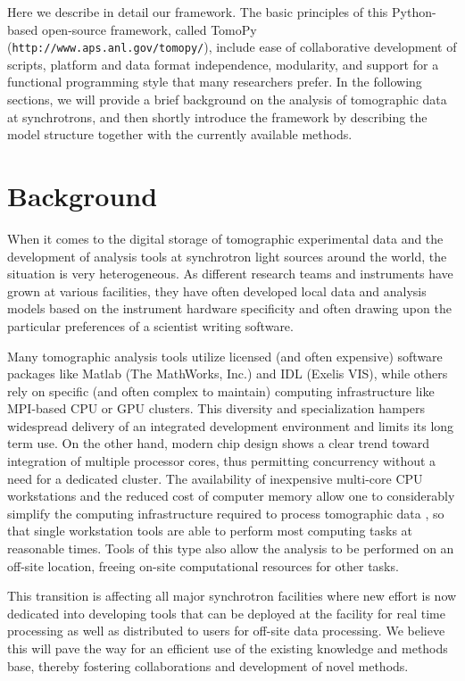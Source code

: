 \documentclass[pdf]{iucr}              %
\begin{document}
Here we describe in detail our framework. The basic principles of this Python-based open-source framework, called TomoPy (\texttt{http://www.aps.anl.gov/tomopy/}), include ease of collaborative development of scripts, platform and data format independence, modularity,  and support for a functional programming style that many researchers prefer. In the following sections, we will provide a brief background on the analysis of tomographic data at synchrotrons, and then shortly introduce the framework by describing the model structure together with the currently available methods. 


\section{Background}

When it comes to the digital storage of tomographic experimental data and the development of analysis tools at synchrotron light sources around the world, the situation is very heterogeneous. As different research teams and instruments have grown at various facilities, they have often developed local data and analysis models based on the instrument hardware specificity and often drawing upon the particular preferences of a scientist writing software. 

Many tomographic analysis tools utilize licensed (and often expensive) software packages like Matlab (The MathWorks, Inc.) and IDL (Exelis VIS), while others rely on specific (and often complex to maintain) computing infrastructure like MPI-based CPU or GPU clusters. This diversity and specialization hampers widespread delivery of an integrated development environment and limits its long term use. On the other hand, modern chip design shows a clear trend toward integration of multiple processor cores, thus permitting concurrency without a need for a dedicated cluster. The availability of inexpensive multi-core CPU workstations and the reduced cost of computer memory allow one to considerably simplify the computing infrastructure required to process tomographic data \cite{rivers_spie_2012}, so that single workstation tools are able to perform most computing tasks at reasonable times. Tools of this type also allow the analysis to be performed on an off-site location, freeing on-site computational resources for other tasks. 

This transition is affecting all major synchrotron facilities where new effort is now dedicated into developing tools that can be deployed at the facility for real time processing as well as distributed to users for off-site data processing. We believe this will pave the way for an efficient use of the existing knowledge and methods base, thereby fostering collaborations and development of novel methods.
\end{document}

